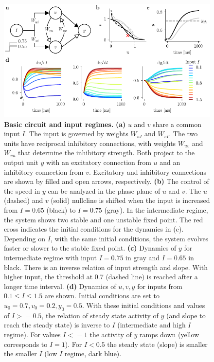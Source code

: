 \documentclass[10pt, a4paper]{article}
\begin{document}
\begin{figure}[ht]
	\centering
	\includegraphics{figures/defCircuit_nullcl.pdf}
	\caption{\textbf{Basic circuit and input regimes.} 
	\textbf{(a)} $u$ and $v$ share a common input $I$. The input is governed by weights $W_{uI}$ and $W_{vI}$. The two units have reciprocal inhibitory connections, with weights $W_{uv}$ and $W_{vu}$ that determine the inhibitory strength. Both project to the output unit $y$ with an excitatory connection from $u$ and an inhibitory connection from $v$. Excitatory and inhibitory connections are shown by filled and open arrows, respectively. 
	\textbf{(b)} The control of the speed in $y$ can be analyzed in the phase plane of $u$ and $v$. The $u$ (dashed) and $v$ (solid) nullcline is shifted when the input is increased from $I=0.65$ (black) to $I=0.75$ (gray). In the intermediate regime, the system shows two stable and one unstable fixed point. The red cross indicates the initial conditions for the dynamics in (c). Depending on $I$, with the same initial conditions, the system evolves faster or slower to the stable fixed point. 
	\textbf{(c)} Dynamics of $y$ for intermediate regime with input $I=0.75$ in gray and $I=0.65$ in black. There is an inverse relation of input strength and slope. With higher input, the threshold at 0.7 (dashed line) is reached after a longer time interval. 
	\textbf{(d)} Dynamics of $u, v, y$ for inputs from $0.1\leq I \leq 1.5$ are shown. Initial conditions are set to $u_0=0.7, v_0=0.2, y_0=0.5$. With these initial conditions and values of $I>=0.5$, the relation of steady state activity of $y$ (and slope to reach the steady state) is inverse to $I$ (intermediate and high $I$ regime). For values $I<=1$ the activity of $y$ ramps down (yellow corresponds to $I=1$). For $I<0.5$ the steady state (slope) is smaller the smaller $I$ (low $I$ regime, dark blue).}
\label{fig:circuit}
\end{figure}
\end{document}
